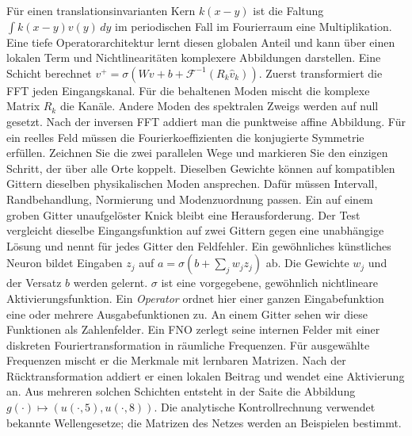 \hypertarget{punkt9-2-1}{}
Für einen translationsinvarianten Kern \(k(x-y)\) ist die Faltung \(\int k(x-y)v(y)\,dy\) im periodischen Fall im Fourierraum eine Multiplikation. Eine tiefe Operatorarchitektur lernt diesen globalen Anteil und kann über einen lokalen Term und Nichtlinearitäten komplexere Abbildungen darstellen.
\hypertarget{punkt9-2-2}{}
Eine Schicht berechnet \(v^+=\sigma(Wv+b+\mathcal F^{-1}(R_k\widehat v_k))\). Zuerst transformiert die FFT jeden Eingangskanal. Für die behaltenen Moden mischt die komplexe Matrix \(R_k\) die Kanäle. Andere Moden des spektralen Zweigs werden auf null gesetzt. Nach der inversen FFT addiert man die punktweise affine Abbildung. Für ein reelles Feld müssen die Fourierkoeffizienten die konjugierte Symmetrie erfüllen. Zeichnen Sie die zwei parallelen Wege und markieren Sie den einzigen Schritt, der über alle Orte koppelt.
\hypertarget{punkt9-2-3}{}
Dieselben Gewichte können auf kompatiblen Gittern dieselben physikalischen Moden ansprechen. Dafür müssen Intervall, Randbehandlung, Normierung und Modenzuordnung passen. Ein auf einem groben Gitter unaufgelöster Knick bleibt eine Herausforderung. Der Test vergleicht dieselbe Eingangsfunktion auf zwei Gittern gegen eine unabhängige Lösung und nennt für jedes Gitter den Feldfehler.
Ein gewöhnliches künstliches Neuron bildet Eingaben \(z_j\) auf \(a=\sigma(b+\sum_j w_j z_j)\) ab. Die Gewichte \(w_j\) und der Versatz \(b\) werden gelernt. \(\sigma\) ist eine vorgegebene, gewöhnlich nichtlineare Aktivierungsfunktion. Ein \emph{Operator} ordnet hier einer ganzen Eingabefunktion eine oder mehrere Ausgabefunktionen zu. An einem Gitter sehen wir diese Funktionen als Zahlenfelder.
Ein FNO zerlegt seine internen Felder mit einer diskreten Fouriertransformation in räumliche Frequenzen. Für ausgewählte Frequenzen mischt er die Merkmale mit lernbaren Matrizen. Nach der Rücktransformation addiert er einen lokalen Beitrag und wendet eine Aktivierung an. Aus mehreren solchen Schichten entsteht in der Saite die Abbildung \(g(\cdot)\mapsto (u(\cdot,5),u(\cdot,8))\). Die analytische Kontrollrechnung verwendet bekannte Wellengesetze; die Matrizen des Netzes werden an Beispielen bestimmt.
